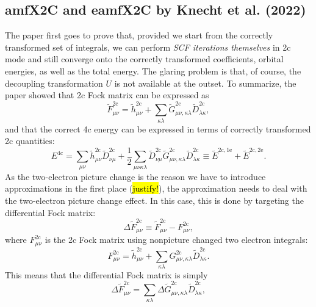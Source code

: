 \documentclass{article}
\begin{document}
\subsection{amfX2C and eamfX2C by Knecht et al. (2022)}
The paper \cite{knechtExactTwocomponentHamiltonians2022} first goes to prove that, provided we start from the correctly transformed set of integrals, we can perform \textit{SCF iterations themselves} in 2c mode and still converge onto the correctly transformed coefficients, orbital energies, as well as the total energy. The glaring problem is that, of course, the decoupling transformation $U$ is not available at the outset. To summarize, the paper showed that 2c Fock matrix can be expressed as
\begin{equation}
\tilde{F}_{\mu\nu}^{\mathrm{2c}}=\tilde{h}^{\mathrm{2c}}_{\mu\nu}+\sum_{\kappa\lambda}\tilde{G}^{\mathrm{2c}}_{\mu\nu,\kappa\lambda}\tilde{D}_{\lambda\kappa}^{\mathrm{2c}},
\end{equation}
and that the correct 4c energy can be expressed in terms of correctly transformed 2c quantities:
\begin{equation}
E^{\mathrm{4c}}=\sum_{\mu\nu}\tilde{h}^{\mathrm{2c}}_{\mu\nu}\tilde{D}_{\nu\mu}^{\mathrm{2c}}+\frac{1}{2}\sum_{\mu\nu\kappa\lambda}\tilde{D}_{\nu\mu}^{\mathrm{2c}}\tilde{G}^{\mathrm{2c}}_{\mu\nu,\kappa\lambda}\tilde{D}_{\lambda\kappa}^{\mathrm{2c}}\equiv\tilde{E}^{\mathrm{2c,1e}}+\tilde{E}^{\mathrm{2c,2e}}.
\end{equation}
As the two-electron picture change is the reason we have to introduce approximations in the first place (\hl{justify!}), the approximation needs to deal with the two-electron picture change effect. In this case, this is done by targeting the differential Fock matrix:
\begin{equation}
\Delta\tilde{F}^{\mathrm{2c}}_{\mu\nu}\equiv\tilde{F}^{\mathrm{2c}}_{\mu\nu}-{F}^{\mathrm{2c}}_{\mu\nu},
\end{equation}
where ${F}^{\mathrm{2c}}_{\mu\nu}$ is the 2c Fock matrix using nonpicture changed two electron integrals:
\begin{equation}
{F}_{\mu\nu}^{\mathrm{2c}}=\tilde{h}^{\mathrm{2c}}_{\mu\nu}+\sum_{\kappa\lambda}{G}^{\mathrm{2c}}_{\mu\nu,\kappa\lambda}\tilde{D}_{\lambda\kappa}^{\mathrm{2c}}.
\end{equation}
This means that the differential Fock matrix is simply
\begin{equation}
\Delta\tilde{F}^{\mathrm{2c}}_{\mu\nu}=\sum_{\kappa\lambda}\Delta\tilde{G}^{\mathrm{2c}}_{\mu\nu,\kappa\lambda}\tilde{D}_{\lambda\kappa}^{\mathrm{2c}},
\end{equation}
\end{document}
